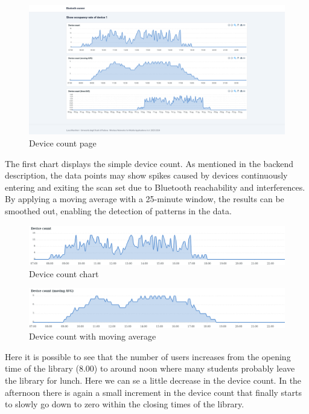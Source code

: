 \documentclass[a4paper, 11pt]{article}
\begin{document}
\begin{figure}[H]
    \centering
    \includegraphics[width=1\linewidth]{images/DeviceShowScreenshot.png}
    \caption{Device count page}
    \label{fig:web-show}
\end{figure}

The first chart displays the simple device count. As mentioned in the backend description, the data points may show spikes caused by devices continuously entering and exiting the scan set due to Bluetooth reachability and interferences. By applying a moving average with a 25-minute window, the results can be smoothed out, enabling the detection of patterns in the data.

\begin{figure}[H]
    \centering
    \includegraphics[width=1\linewidth]{images/c1wdhap3.png}
    \caption{Device count chart}
\end{figure}

\begin{figure}[H]
    \centering
    \includegraphics[width=1\linewidth]{images/tp0w3w99f.png}
    \caption{Device count with moving average}
\end{figure}

Here it is possible to see that the number of users increases from the opening time of the library (8.00) to around noon where many students probably leave the library for lunch. Here we can se a little decrease in the device count. In the afternoon there is again a small increment in the device count that finally starts to slowly go down to zero within the closing times of the library.
\end{document}
